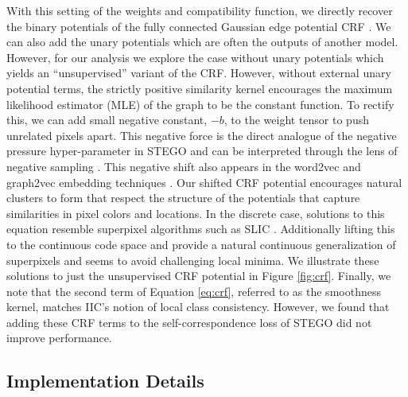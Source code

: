 \documentclass{article} \usepackage{iclr2022_conference,times}
\begin{document}
With this setting of the weights and compatibility function, we directly recover the binary potentials of the fully connected Gaussian edge potential CRF \citep{fullcrf}. We can also add the unary potentials which are often the outputs of another model. However, for our analysis we explore the case without unary potentials which yields an ``unsupervised'' variant of the CRF. However, without external unary potential terms, the strictly positive similarity kernel encourages the maximum likelihood estimator (MLE) of the graph to be the constant function. To rectify this, we can add small negative constant, $-b$, to the weight tensor to push unrelated pixels apart. This negative force is the direct analogue of the negative pressure hyper-parameter in STEGO and can be interpreted through the lens of negative sampling  \citep{mikolov2013distributed}. This negative shift also appears in the word2vec and graph2vec embedding techniques \citep{narayanan2017graph2vec,levy2014neural}. Our shifted CRF potential encourages natural clusters to form that respect the structure of the potentials that capture similarities in pixel colors and locations. In the discrete case, solutions to this equation resemble superpixel algorithms such as SLIC \citep{zhang2015slic}. Additionally lifting this to the continuous code space and provide a natural continuous generalization of superpixels and seems to avoid challenging local minima. We illustrate these solutions to just the unsupervised CRF potential in Figure \ref{fig:crf}. Finally, we note that the second term of Equation \ref{eq:crf}, referred to as the smoothness kernel, matches IIC's notion of local class consistency. However, we found that adding these CRF terms to the self-correspondence loss of STEGO did not improve performance.

\newpage

\subsection{Implementation Details}
 \label{sec:implementation-details}
\end{document}
